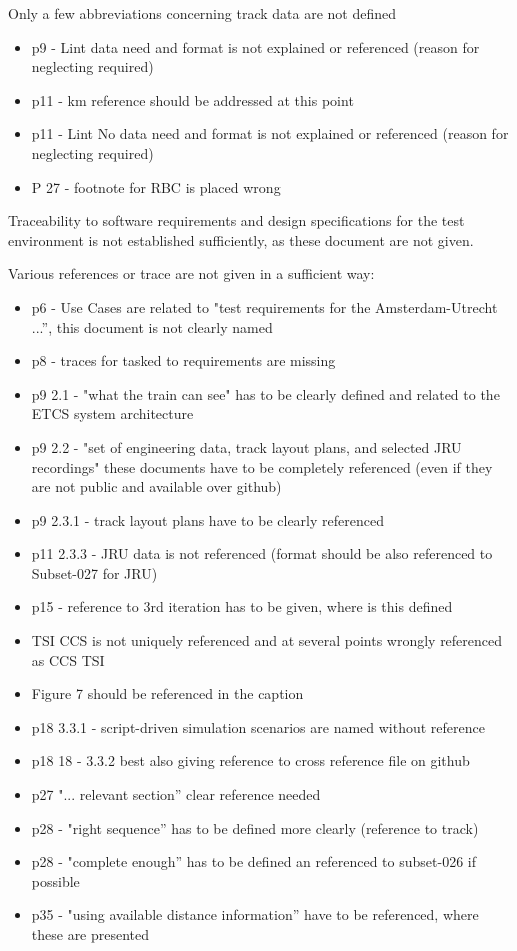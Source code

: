 \documentclass{article}
\begin{document}
Only a few abbreviations concerning track data are not defined
\begin{itemize}
\item p9 - Lint data need and format is not explained or referenced (reason for neglecting required)
\item p11 - km reference  should be addressed at this point
\item p11 - Lint No data need and format is not explained or referenced (reason for neglecting required)
\item P 27 - footnote for RBC is placed wrong
\end{itemize}

Traceability to software requirements and design specifications for the test environment is not established sufficiently, as these document are not given.

Various references or trace are not given in a sufficient way:
\begin{itemize}
\item p6 - Use Cases are related to "test requirements for the Amsterdam-Utrecht ...'', this document is not clearly named
\item p8 - traces for tasked to requirements are missing
\item p9 2.1 - "what the train can see" has to be clearly defined and related to the ETCS system architecture
\item p9 2.2 - "set of engineering data, track layout plans, and selected JRU recordings" these documents have to be completely referenced (even if they are not public and available over github)
\item p9 2.3.1 - track layout plans have to be clearly referenced
\item p11 2.3.3 - JRU data is not referenced (format should be also referenced to Subset-027 for JRU)
\item p15 - reference to 3rd iteration has to be given, where is this defined
\item TSI CCS is not uniquely referenced and at several points wrongly referenced as CCS TSI
\item Figure 7 should be referenced in the caption
\item p18 3.3.1 - script-driven simulation scenarios are named without reference
\item p18 18 - 3.3.2 best also giving reference to cross reference file on github
\item p27 "... relevant section'' clear reference needed
\item p28 - "right sequence'' has to be defined more clearly (reference to track)
\item p28 - "complete enough'' has to be defined an referenced to subset-026 if possible 
\item p35 - "using available distance information'' have to be referenced, where these are presented
\end{itemize}
\end{document}

